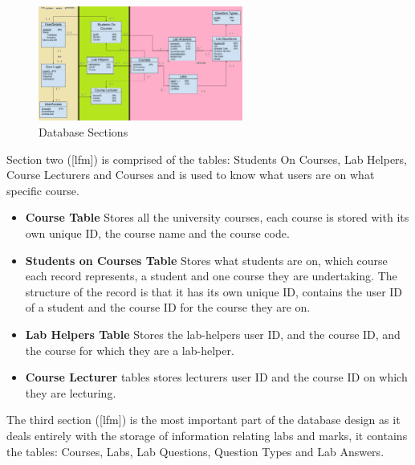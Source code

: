 \documentclass[12pt]{article}  %
\begin{document}
\begin{figure}[H]
    \centering
    \includegraphics[width=0.6\textwidth]{images/design/DB_Sections.png}
    \caption{Database Sections}
    \label{fig:dbsections}
\end{figure}


\noindent Section two ([lfm]) is comprised of the tables: Students On Courses, Lab Helpers, Course Lecturers and Courses and is used to know what users are on what specific course.
\begin{itemize}
    \item \textbf{Course Table} Stores all the university courses, each course is stored with its own unique ID, the course name and the course code.
    \item \textbf{Students on Courses Table} Stores what students are on, which course each record represents, a student and one course they are undertaking. The structure of the record is that it has its own unique ID, contains the user ID of a student and the course ID for the course they are on. 
    \item \textbf{Lab Helpers Table} Stores the lab-helpers user ID, and the course ID, and the course for which they are a lab-helper.
    \item \textbf{Course Lecturer} tables stores lecturers user ID and the course ID on which they are lecturing.
\end{itemize}



The third section ([lfm]) is the most important part of the database design as it deals entirely with the storage of information relating labs and marks, it contains the tables: Courses, Labs, Lab Questions, Question Types and Lab Answers.
\end{document}
